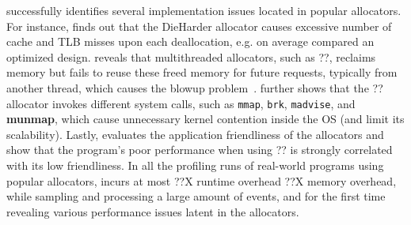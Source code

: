 \MP{} successfully identifies several implementation issues located in popular allocators. For instance, \MP{} finds out that the DieHarder allocator causes excessive number of cache and TLB misses upon each deallocation, e.g.  on average compared an optimized design. \MP{} reveals that multithreaded allocators, such as ??, reclaims memory but fails to reuse these freed memory for future requests, typically from another thread, which causes the blowup problem~\cite{Hoard}. \MP further shows that the ??allocator invokes different system calls, such as \texttt{mmap}, \texttt{brk}, \texttt{madvise}, and \textbf{munmap}, which cause unnecessary kernel contention inside the OS (and limit its scalability). Lastly, \MP{} evaluates the application friendliness of the allocators and show that the program's poor performance when using ?? is strongly correlated with its low friendliness. In all the profiling runs of real-world programs using popular allocators, \MP{} incurs at most ??X runtime overhead ??X memory overhead, while sampling and processing a large amount of events, and for the first time revealing various performance issues latent in the allocators.

%

